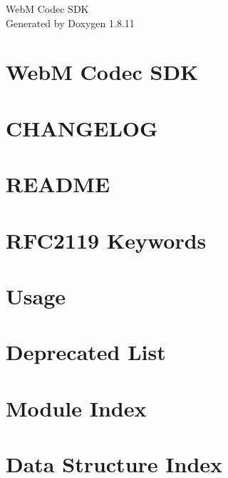 \documentclass[twoside]{article}
\newcommand{\+}{\discretionary{\mbox{\scriptsize$\hookleftarrow$}}{}{}}
\begin{document}
\hypersetup{pageanchor=false,
             bookmarksnumbered=true,
             pdfencoding=unicode
            }
\begin{titlepage}
\vspace*{7cm}
\begin{center}%
{\Large WebM Codec S\+DK }\\
\vspace*{1cm}
{\large Generated by Doxygen 1.8.11}\\
\end{center}
\end{titlepage}
\tableofcontents
{}
\hypersetup{pageanchor=true}

\section{WebM Codec S\+DK}
\label{index}\hypertarget{index}{}
\section{C\+H\+A\+N\+G\+E\+L\+OG}
\label{changelog}
\hypertarget{changelog}{}

\section{R\+E\+A\+D\+ME}
\label{readme}
\hypertarget{readme}{}

\section{R\+F\+C2119 Keywords}
\label{rfc2119}
\hypertarget{rfc2119}{}

\section{Usage}
\label{usage}
\hypertarget{usage}{}

\section{Deprecated List}
\label{deprecated}
\hypertarget{deprecated}{}

\section{Module Index}

\section{Data Structure Index}

\end{document}
